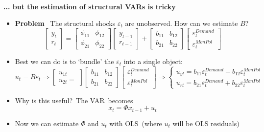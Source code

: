 \documentclass[10pt,english,t,aspectratio=169,ignorenonframetext]{beamer}
\begin{document}
\begin{frame}
{\textbf{... but the estimation of structural VARs is tricky}}

\begin{itemize}
\item \textbf{Problem} \ The structural shocks $\varepsilon _{t}$ are
unobserved. How can we estimate $B$? 
\begin{equation*}
\begin{bmatrix}
y_{t} \\ 
r_{t}%
\end{bmatrix}%
=%
\begin{bmatrix}
\phi _{11} & \phi _{12} \\ 
\phi _{21} & \phi _{22}%
\end{bmatrix}%
\begin{bmatrix}
y_{t-1} \\ 
r_{t-1}%
\end{bmatrix}%
+%
\begin{bmatrix}
b_{11} & b_{12} \\ 
b_{21} & b_{22}%
\end{bmatrix}%
\begin{bmatrix}
\varepsilon _{t}^{Demand} \\ 
\varepsilon _{t}^{MonPol}%
\end{bmatrix}%
\end{equation*}%
\pause

\item Best we can do is to `bundle' the $\varepsilon _{t}$ into a single
object: 
\begin{equation*}
u_{t}=B\varepsilon _{t}\Rightarrow 
\begin{bmatrix}
u_{1t} \\ 
u_{2t}=
\end{bmatrix}%
\left[ 
\begin{array}{cc}
b_{11} & b_{12} \\ 
b_{21} & b_{22}%
\end{array}%
\right] 
\begin{bmatrix}
\varepsilon _{t}^{Demand} \\ 
\varepsilon _{t}^{MonPol}%
\end{bmatrix}%
\Rightarrow \left\{ 
\begin{array}{c}
u_{yt}=b_{11}\varepsilon _{t}^{Demand}+b_{12}\varepsilon _{t}^{MonPol} \\ 
u_{rt}=b_{21}\varepsilon _{t}^{Demand}+b_{22}\varepsilon _{t}^{MonPol}%
\end{array}%
\right.
\end{equation*}
\pause

\item Why is this useful?\ The VAR\ becomes%
\begin{equation*}
x_{t}=\Phi x_{t-1}+u_{t}
\end{equation*}%
\vspace{-.3cm}

\item Now we can estimate $\Phi $ and $u_{t}$ with OLS\ (where $u_{t}$ will
be OLS residuals)
\end{itemize}
\end{frame}
\end{document}
